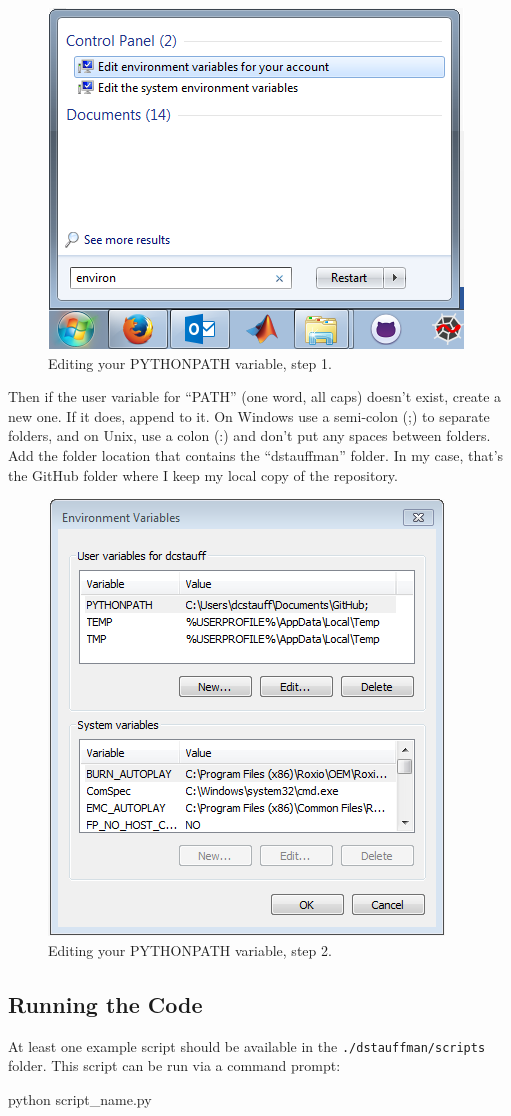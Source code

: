 \documentclass[12pt]{article}
\begin{document}
\begin{figure}[H]
    \centering
    \includegraphics[width=.6\textwidth]{Environment_Variables1.png}
    \caption{Editing your PYTHONPATH variable, step 1.}
    \label{fig:environment1}
\end{figure}

Then if the user variable for ``PATH'' (one word, all caps) doesn't exist, create a new one. If it does, append to it.  On Windows use a semi-colon (;) to separate folders, and on Unix, use a colon (:) and don't put any spaces between folders.  Add the folder location that contains the ``dstauffman'' folder.  In my case, that's the GitHub folder where I keep my local copy of the repository.

\begin{figure}[H]
    \centering
    \includegraphics[width=.6\textwidth]{Environment_Variables2.png}
    \caption{Editing your PYTHONPATH variable, step 2.}
    \label{fig:environment2}
\end{figure}


\subsection{Running the Code}\label{h2:Running_the_code}
At least one example script should be available in the \texttt{./dstauffman/scripts} folder.  This script can be run via a command prompt:
\begin{PlainText}
python script_name.py
\end{PlainText}
\end{document}
